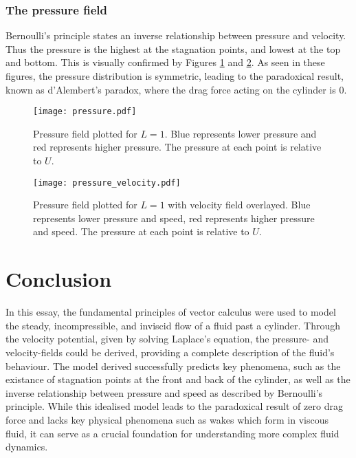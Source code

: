 \subsubsection{The pressure field}
Bernoulli's principle states an inverse relationship between pressure and velocity. Thus the pressure is the highest at the stagnation points,
and lowest at the top and bottom. This is visually confirmed by Figures \ref{figure:pressure:1} and \ref{figure:pressure:2}. As seen in these figures,
the pressure distribution is symmetric, leading to the paradoxical result, known as d'Alembert's paradox, where the drag force acting on the cylinder is $0$.
\begin{figure}
	\centering
	\texttt{[image: pressure.pdf]}
	\caption{Pressure field plotted for $L=1$. Blue represents lower pressure and red represents higher pressure. The pressure at each point is relative to $U$.}
	\label{figure:pressure:1}
\end{figure}
\begin{figure}
	\centering
	\texttt{[image: pressure\_velocity.pdf]}
	\caption{Pressure field plotted for $L=1$ with velocity field overlayed. Blue represents lower pressure and speed, red represents higher pressure and speed. The pressure at each point is relative to $U$.}
	\label{figure:pressure:2}
\end{figure}

\section{Conclusion}
In this essay, the fundamental principles of vector calculus were used to model the steady, incompressible, and inviscid flow of a fluid past a cylinder.
Through the velocity potential, given by solving Laplace's equation, the pressure- and velocity-fields could be derived, providing a complete 
description of the fluid's behaviour. The model derived successfully predicts key phenomena, such as the existance of stagnation points at the front and
back of the cylinder, as well as the inverse relationship between pressure and speed as described by Bernoulli's principle. While this idealised model
leads to the paradoxical result of zero drag force and lacks key physical phenomena such as wakes which form in viscous fluid, it can serve as a crucial
foundation for understanding more complex fluid dynamics.